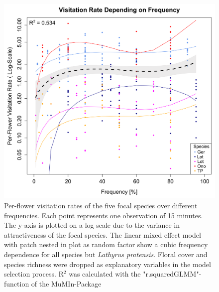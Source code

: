 \begin{figure} [!th] %
	\centering
	\includegraphics[width=14cm]{Images/LME}
	\caption{Per-flower visitation rates of the five focal species over different frequencies. Each point represents one observation of 15 minutes. The y-axis is plotted on a log scale due to the variance in attractiveness of the focal species. The linear mixed effect model with patch nested in plot as random factor show a cubic frequency dependence for all species but \textit{Lathyrus pratensis}. Floral cover and species richness were dropped as explanatory variables in the model selection process. R$^{2}$ was calculated with the "r.squaredGLMM"-function of the MuMIn-Package \citep{MuMIn}}
	\label{fig:LME}
\end{figure}

